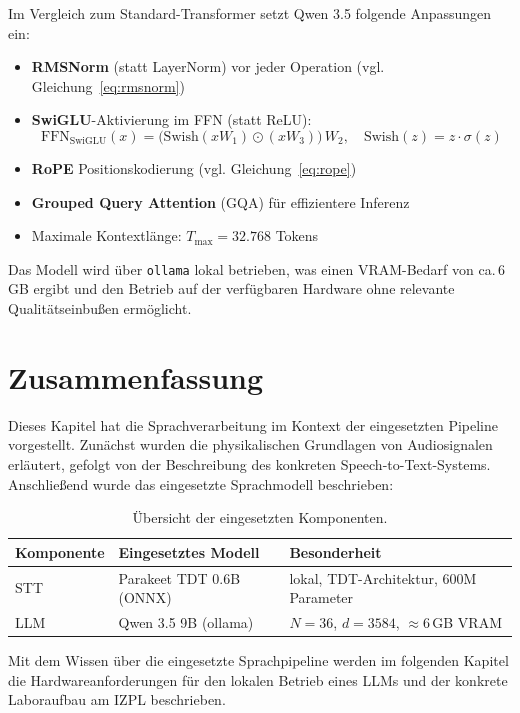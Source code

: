 Im Vergleich zum Standard-Transformer setzt Qwen 3.5 folgende
Anpassungen ein:
\begin{itemize}
    \item \textbf{RMSNorm} (statt LayerNorm) vor jeder Operation
          (vgl. Gleichung~\ref{eq:rmsnorm})
    \item \textbf{SwiGLU}-Aktivierung im FFN (statt ReLU):
          \begin{equation}
              \text{FFN}_{\text{SwiGLU}}(x) =
              \bigl(\text{Swish}(xW_1) \odot (xW_3)\bigr)\,W_2,
              \quad \text{Swish}(z) = z \cdot \sigma(z)
              \label{eq:swiglu}
          \end{equation}
    \item \textbf{RoPE} Positionskodierung (vgl. Gleichung~\ref{eq:rope})
    \item \textbf{Grouped Query Attention} (GQA) für effizientere Inferenz
    \item Maximale Kontextlänge: $T_{\max} = 32.768$ Tokens
\end{itemize}

Das Modell wird über \texttt{ollama}
lokal betrieben, was einen VRAM-Bedarf von ca.\,6\,GB ergibt und
den Betrieb auf der verfügbaren Hardware ohne relevante
Qualitätseinbußen ermöglicht.

\section{Zusammenfassung}

Dieses Kapitel hat die Sprachverarbeitung im Kontext der eingesetzten Pipeline vorgestellt.
Zunächst wurden die physikalischen Grundlagen von Audiosignalen erläutert,
gefolgt von der Beschreibung des konkreten Speech-to-Text-Systems.
Anschließend wurde das eingesetzte Sprachmodell beschrieben:

\begin{table}[H]
    \centering
    \small
    \begin{tabular}{l l l}
        \toprule
        Komponente & Eingesetztes Modell & Besonderheit \\
        \midrule
        STT & Parakeet TDT 0.6B (ONNX) & lokal, TDT-Architektur, 600M Parameter \\
        LLM & Qwen 3.5 9B (ollama) & $N{=}36$, $d{=}3584$, $\approx$6\,GB VRAM \\
        \bottomrule
    \end{tabular}
    \caption{Übersicht der eingesetzten Komponenten.}
    \label{tab:zusammenfassung}
\end{table}

Mit dem Wissen über die eingesetzte Sprachpipeline werden im folgenden Kapitel die Hardwareanforderungen für den lokalen Betrieb eines LLMs und der konkrete Laboraufbau am IZPL beschrieben.
